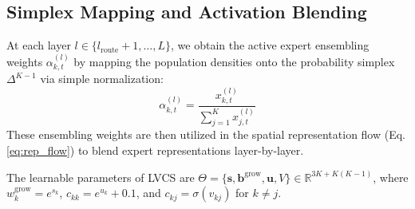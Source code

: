 \subsection{Simplex Mapping and Activation Blending}
At each layer $l \in \{l_{\text{route}}+1, \dots, L\}$, we obtain the active expert ensembling weights $\alpha_{k, t}^{(l)}$ by mapping the population densities onto the probability simplex $\Delta^{K-1}$ via simple normalization:
\begin{equation}
    \alpha_{k, t}^{(l)} = \frac{x_{k, t}^{(l)}}{\sum_{j=1}^K x_{j, t}^{(l)}}
\end{equation}
These ensembling weights are then utilized in the spatial representation flow (Eq. \ref{eq:rep_flow}) to blend expert representations layer-by-layer.

The learnable parameters of LVCS are $\Theta = \{\mathbf{s}, \mathbf{b}^{\text{grow}}, \mathbf{u}, V\} \in \mathbb{R}^{3K + K(K-1)}$, where $w_k^{\text{grow}} = e^{s_k}$, $c_{kk} = e^{u_k} + 0.1$, and $c_{kj} = \sigma(v_{kj})$ for $k \neq j$.
